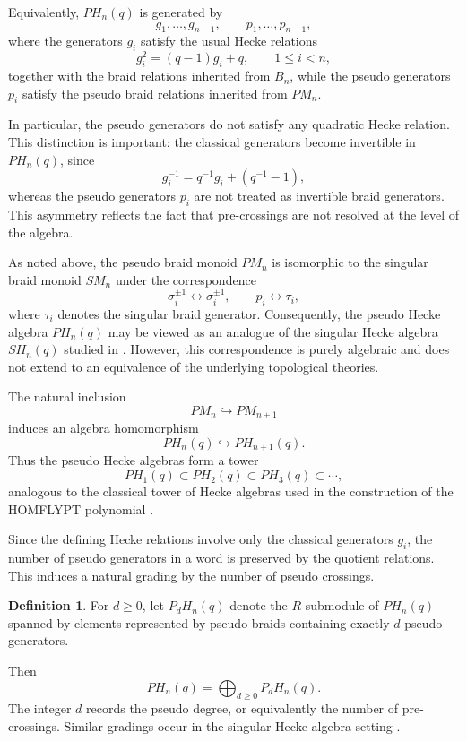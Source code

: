 \documentclass[11pt]{article}
\numberwithin{equation}{section}
\theoremstyle{definition}
\newtheorem{definition}[theorem]{Definition}
\begin{document}
Equivalently, \(PH_n(q)\) is generated by
\[
g_1,\ldots,g_{n-1},
\qquad
p_1,\ldots,p_{n-1},
\]
where the generators \(g_i\) satisfy the usual Hecke relations
\[
g_i^2=(q-1)g_i+q,
\qquad 1\leq i<n,
\]
together with the braid relations inherited from \(B_n\), while the pseudo generators \(p_i\) satisfy the pseudo braid relations inherited from \(PM_n\).

In particular, the pseudo generators do not satisfy any quadratic Hecke relation. This distinction is important: the classical generators become invertible in \(PH_n(q)\), since
\[
g_i^{-1}=q^{-1}g_i+(q^{-1}-1),
\]
whereas the pseudo generators \(p_i\) are not treated as invertible braid generators. This asymmetry reflects the fact that pre-crossings are not resolved at the level of the algebra.


As noted above, the pseudo braid monoid \(PM_n\) is isomorphic to the singular braid monoid \(SM_n\) under the correspondence
\[
\sigma_i^{\pm1}\longleftrightarrow \sigma_i^{\pm1},
\qquad
p_i\longleftrightarrow \tau_i,
\]
where \(\tau_i\) denotes the singular braid generator. Consequently, the pseudo Hecke algebra \(PH_n(q)\) may be viewed as an analogue of the singular Hecke algebra \(SH_n(q)\) studied in \cite{ParisRabenda2008}. However, this correspondence is purely algebraic and does not extend to an equivalence of the underlying topological theories.


The natural inclusion
\[
PM_n\hookrightarrow PM_{n+1}
\]
induces an algebra homomorphism
\[
PH_n(q)\hookrightarrow PH_{n+1}(q).
\]
Thus the pseudo Hecke algebras form a tower
\[
PH_1(q)\subset PH_2(q)\subset PH_3(q)\subset \cdots ,
\]
analogous to the classical tower of Hecke algebras used in the construction of the HOMFLYPT polynomial \cite{Jones1987}.

Since the defining Hecke relations involve only the classical generators \(g_i\), the number of pseudo generators in a word is preserved by the quotient relations. This induces a natural grading by the number of pseudo crossings.

\begin{definition}\label{def:grading}
For \(d\geq 0\), let \(P_dH_n(q)\) denote the \(R\)-submodule of \(PH_n(q)\) spanned by elements represented by pseudo braids containing exactly \(d\) pseudo generators.
\end{definition}

Then
\[
PH_n(q)
=
\bigoplus_{d\geq 0} P_dH_n(q).
\]
The integer \(d\) records the pseudo degree, or equivalently the number of pre-crossings. Similar gradings occur in the singular Hecke algebra setting
\cite{ParisRabenda2008}.
\end{document}
